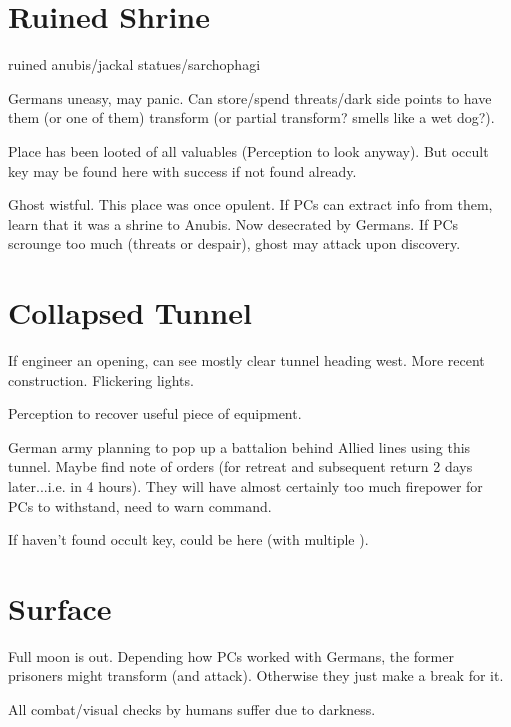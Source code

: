 \documentclass[background]{book}
\newcommand{\df}{\DifficultyDie}
\newcommand{\stb}{\SetbackDie}
\newcommand{\ch}{\ChallengeDie}
\begin{document}
\begin{multicols}{2}
\section{Ruined Shrine}

ruined anubis/jackal statues/sarchophagi

Germans uneasy, may panic.  Can store/spend threats/dark side points to have them (or one of them) transform (or partial transform?  smells like a wet dog?).

Place has been looted of all valuables (\ch\df\stb\stb Perception to look anyway).  But occult key may be found here with success if not found already.

Ghost wistful.  This place was once opulent.  If PCs can extract info from them, learn that it was a shrine to Anubis.  Now desecrated by Germans.  If PCs scrounge too much (threats or despair), ghost may attack upon discovery.


\section{Collapsed Tunnel}

If engineer an opening, can see mostly clear tunnel heading west.  More recent construction.  Flickering lights.

\df\df Perception to recover useful piece of equipment.

German army planning to pop up a battalion behind Allied lines using this tunnel.  Maybe find note of orders (for retreat and subsequent return 2 days later...i.e. in 4 hours).  They will have almost certainly too much firepower for PCs to withstand, need to warn command.

If haven't found occult key, could be here (with multiple \Advantage).

\section{Surface}

Full moon is out.  Depending how PCs worked with Germans, the former prisoners might transform (and attack).  Otherwise they just make a break for it.

All combat/visual checks by humans suffer \stb due to darkness.


\end{multicols}
\end{document}
